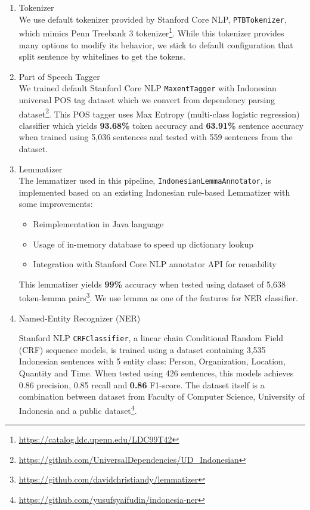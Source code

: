 \documentclass[peerreview,12pt]{IEEEtran}
\begin{document}
\begin{enumerate}

\item Tokenizer \\
We use default tokenizer provided by Stanford Core NLP, \verb|PTBTokenizer|\cite{manningptbtokenizer}, which mimics Penn Treebank 3 tokenizer\footnote{\url{https://catalog.ldc.upenn.edu/LDC99T42}}. While this tokenizer provides many options to modify its behavior, we stick to default configuration that split sentence by whitelines to get the tokens.\\

\item Part of Speech Tagger \\
We trained default Stanford Core NLP \verb|MaxentTagger|\cite{toutanova2003feature} with Indonesian universal POS tag dataset which we convert from dependency parsing dataset\footnote{\url{https://github.com/UniversalDependencies/UD_Indonesian}}. This POS tagger uses Max Entropy (multi-class logistic regression) classifier which yields \textbf{93.68\%} token accuracy and \textbf{63.91\%} sentence accuracy when trained using 5,036 sentences and tested with 559 sentences from the dataset. \\

\item Lemmatizer \\
The lemmatizer used in this pipeline, \verb|IndonesianLemmaAnnotator|, is implemented based on an existing Indonesian rule-based Lemmatizer\cite{suhartono2014lemmatization} with some improvements:

\begin{itemize}
\item Reimplementation in Java language
\item Usage of in-memory database to speed up dictionary lookup
\item Integration with Stanford Core NLP annotator API for reusability
\end{itemize}

This lemmatizer yields \textbf{99\%} accuracy when tested using dataset of 5,638 token-lemma pairs\footnote{\url{https://github.com/davidchristiandy/lemmatizer}}. We use lemma as one of the features for NER classifier. \\


\item Named-Entity Recognizer (NER)

Stanford NLP \verb|CRFClassifier|\cite{finkel2005incorporating}, a linear chain Conditional Random Field (CRF) sequence models, is trained using a dataset containing 3,535 Indonesian sentences with 5 entity class: Person, Organization, Location, Quantity and Time. When tested using 426 sentences, this models achieves 0.86 precision, 0.85 recall and \textbf{0.86} F1-score. The dataset itself is a combination between dataset from Faculty of Computer Science, University of Indonesia and a public dataset\footnote{\url{https://github.com/yusufsyaifudin/indonesia-ner}}. \\


\end{enumerate}
\end{document}
